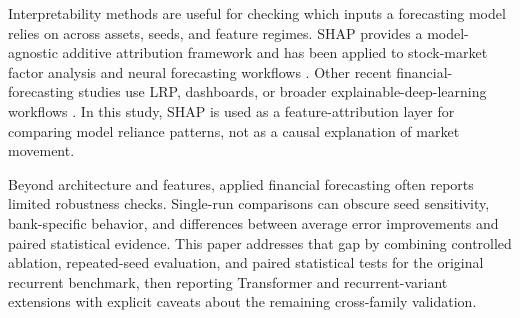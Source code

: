 Interpretability methods are useful for checking which inputs a forecasting model relies on across assets, seeds, and feature regimes. SHAP provides a model-agnostic additive attribution framework \cite{lundberg2017shap} and has been applied to stock-market factor analysis and neural forecasting workflows \cite{shih2024lightgbm_shap,begum2025shap_rnn_stock,gupta2025lstm_shap_xai}. Other recent financial-forecasting studies use LRP, dashboards, or broader explainable-deep-learning workflows \cite{tanveer2024xai_stock,tanveer2024lrp_stock,jagannathan2025hybrid_xai_stock,ayyappan2025xdl_stock}. In this study, SHAP is used as a feature-attribution layer for comparing model reliance patterns, not as a causal explanation of market movement.

Beyond architecture and features, applied financial forecasting often reports limited robustness checks. Single-run comparisons can obscure seed sensitivity, bank-specific behavior, and differences between average error improvements and paired statistical evidence. This paper addresses that gap by combining controlled ablation, repeated-seed evaluation, and paired statistical tests for the original recurrent benchmark, then reporting Transformer and recurrent-variant extensions with explicit caveats about the remaining cross-family validation.
